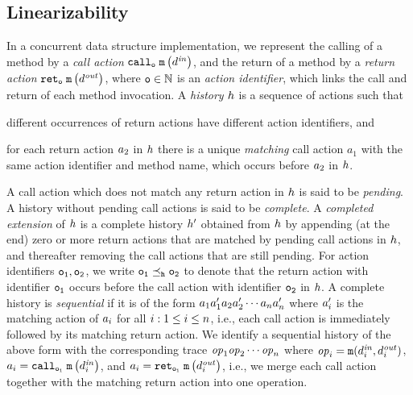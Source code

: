 \subsection{Linearizability}
In a concurrent
data structure implementation, we represent the calling of a method by
a {\it call action} $\mathtt{call}_{\tt o}\; {\tt m}\left(d^{\it in}\right)$, and the return of a method by
a {\it return action} $\mathtt{ret}_{\tt o}\; {\tt m}\left(d^{\it out}\right)$, where $\tt o\in\mathbb{N}$ is an
{\it action identifier}, which links the call and return of each method invocation.
%
A {\it history} $h$ is a sequence of actions such that
\begin{inparaenum}[(i)]
\item
  different occurrences of return actions have different action identifiers, and
\item
  for each return action $a_2$ in $h$ there is a unique
{\it matching}  call action $a_1$ with the same action identifier and method name, which occurs before $a_2$ in $h$.
\end{inparaenum}
%
A call action which does not match any return action in $h$ is said
to be {\em pending}.
A history without pending call actions is said to be {\em complete}.
A {\em completed extension} of $h$ is a complete history
$h'$ obtained from $h$ by
  appending (at the end) zero or more return actions that are matched by
  pending call actions in $h$, and
  thereafter removing the call actions that are still pending.
%
For action identifiers $\tt o_1,\tt o_2$, we write
$\tt o_1\preceq_{h}\tt o_2$ to denote that
the return action with identifier $\tt o_1$ occurs before
the call action with identifier $\tt o_2$ in $h$.
A complete history is {\it sequential} if it is of the form
$a_1a'_1a_2a'_2\cdots a_na'_n$
where $a'_i$ is the matching action of $a_i$ 
for all $i:1\leq i\leq n$, i.e., each call action 
is immediately followed by its matching return action. 
%
We identify a sequential history of the above form with
the corresponding trace 
${\it op}_1{\it op}_2\cdots{\it op}_n$ where
${\it op}_i={\tt m}(d^{\it in}_i,d^{\it out}_i)$,
$a_i=\mathtt{call}_{\tt o_i}\; {\tt m}\left(d^{\it in}_{i}\right)$, and
$a_i=\mathtt{ret}_{\tt o_i}\; {\tt m}\left(d^{\it out}_{i}\right)$,
i.e., we merge each call action together with the matching return action
into one operation.
